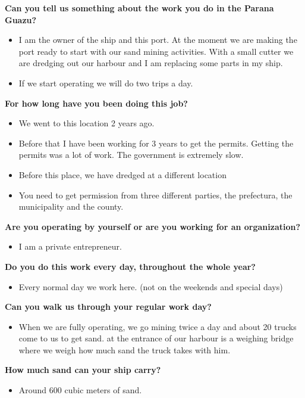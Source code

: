 \textbf{Can you tell us something about the work you do in the Parana Guazu?}
\begin{itemize}
    \item I am the owner of the ship and this port. At the moment we are making the port ready to start with our sand mining activities. With a small cutter we are dredging out our harbour and I am replacing some parts in my ship. 
    \item If we start operating we will do two trips a day. 
\end{itemize}

\textbf{For how long have you been doing this job?}
\begin{itemize}
    \item We went to this location 2 years ago.
    \item Before that I have been working for 3 years to get the permits. Getting the permits was a lot of work. The government is extremely slow. 
    \item Before this place, we have dredged at a different location
    \item You need to get permission from three different parties, the prefectura, the municipality and the county. 
\end{itemize}

\textbf{Are you operating by yourself or are you working for an organization?}
\begin{itemize}
    \item I am a private entrepreneur.  
\end{itemize}

\textbf{Do you do this work every day, throughout the whole year?}
\begin{itemize}
    \item Every normal day we work here. (not on the weekends and special days)
\end{itemize}

\textbf{Can you walk us through your regular work day?}
\begin{itemize}
    \item When we are fully operating, we go mining twice a day and about 20 trucks come to us to get sand. at the entrance of our harbour is a weighing bridge where we weigh how much sand the truck takes with him.
\end{itemize}

\textbf{How much sand can your ship carry?}
\begin{itemize}
    \item Around 600 cubic meters of sand. 
\end{itemize}

